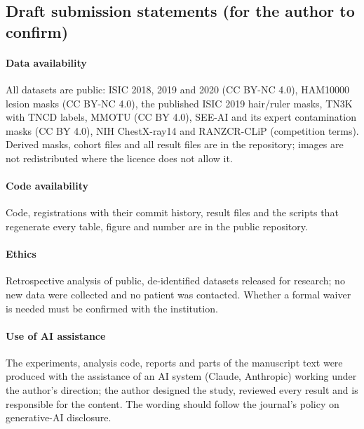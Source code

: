 \subsection{Draft submission statements (for the author to confirm)}
\paragraph{Data availability} All datasets are public: ISIC 2018, 2019 and 2020 (CC BY-NC 4.0), HAM10000 lesion masks
(CC BY-NC 4.0), the published ISIC 2019 hair/ruler masks, TN3K with TNCD labels, MMOTU (CC BY 4.0), SEE-AI and its expert
contamination masks (CC BY 4.0), NIH ChestX-ray14 and RANZCR-CLiP (competition terms). Derived masks, cohort files and all
result files are in the repository; images are not redistributed where the licence does not allow it.
\paragraph{Code availability} Code, registrations with their commit history, result files and the scripts that regenerate
every table, figure and number are in the public repository.
\paragraph{Ethics} Retrospective analysis of public, de-identified datasets released for research; no new data were
collected and no patient was contacted. Whether a formal waiver is needed must be confirmed with the institution.
\paragraph{Use of AI assistance} The experiments, analysis code, reports and parts of the manuscript text were produced
with the assistance of an AI system (Claude, Anthropic) working under the author's direction; the author designed the
study, reviewed every result and is responsible for the content. The wording should follow the journal's policy on
generative-AI disclosure.

